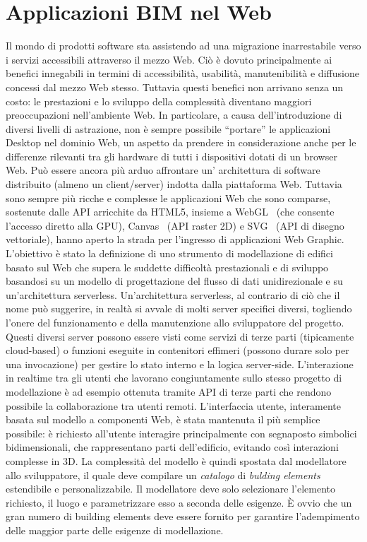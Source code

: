 
\section{Applicazioni BIM nel Web}
\label{sec:chapter_1_section_3}

Il mondo di prodotti software sta assistendo ad una migrazione inarrestabile verso i servizi accessibili
attraverso il mezzo Web. Ciò è dovuto principalmente ai benefici innegabili in termini di accessibilità, usabilità,
manutenibilità e diffusione concessi dal mezzo Web stesso.
Tuttavia questi benefici non arrivano senza un costo: le prestazioni e lo sviluppo della complessità diventano
maggiori preoccupazioni nell'ambiente Web.
In particolare, a causa dell'introduzione di diversi livelli di astrazione, non è sempre possibile ``portare'' le
applicazioni Desktop nel dominio Web, un aspetto da prendere in considerazione anche per le differenze rilevanti
tra gli hardware di tutti i dispositivi dotati di un browser Web.
Può essere ancora più arduo affrontare un' architettura di software distribuito (almeno un client/server)
indotta dalla piattaforma Web. Tuttavia sono sempre più ricche e complesse le applicazioni Web che sono comparse,
sostenute dalle API arricchite da HTML5, insieme a WebGL~\cite{webgl}
(che consente l'accesso diretto alla GPU), Canvas~\cite{Munro:15:HCC} (API raster 2D) e SVG~\cite{Jackson:11:SVG}
(API di disegno vettoriale), hanno aperto la strada per l'ingresso di applicazioni Web Graphic.
L'obiettivo è stato la definizione di uno strumento di modellazione di edifici basato sul Web
che supera le suddette difficoltà prestazionali e di sviluppo basandosi su un modello di progettazione del flusso di dati
unidirezionale e su un'architettura serverless.
Un'architettura serverless, al contrario di ciò che il nome può suggerire, in realtà si avvale di molti server specifici
diversi, togliendo l'onere del funzionamento e della manutenzione allo sviluppatore del progetto.
Questi diversi server possono essere visti come servizi di terze parti (tipicamente cloud-based) o funzioni eseguite
in contenitori effimeri (possono durare solo per una invocazione) per gestire lo stato interno e la logica server-side.
L'interazione in realtime tra gli utenti che lavorano congiuntamente sullo stesso progetto di modellazione
è ad esempio ottenuta tramite API di terze parti che rendono possibile la collaborazione tra utenti remoti.
L'interfaccia utente, interamente basata sul modello a componenti Web, è stata mantenuta il più semplice possibile:
è richiesto all'utente interagire principalmente con segnaposto simbolici bidimensionali, che rappresentano parti dell'edificio,
evitando così interazioni complesse in 3D.
La complessità del modello è quindi spostata dal modellatore allo sviluppatore, il quale deve compilare un \emph{catalogo} di
\emph{bulding elements} estendibile e personalizzabile. Il modellatore deve solo selezionare l'elemento richiesto,
il luogo e parametrizzare esso a seconda delle esigenze. È ovvio che un gran numero di building elements deve essere fornito
per garantire l'adempimento delle maggior parte delle esigenze di modellazione.

